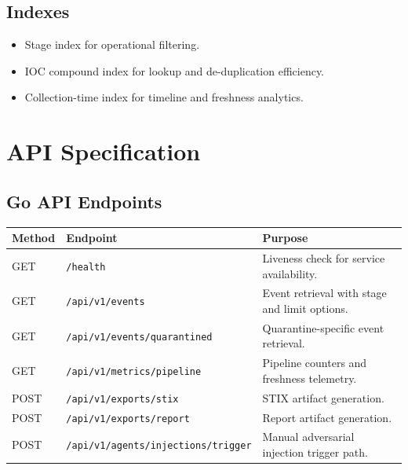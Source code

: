 \documentclass[11pt,a4paper]{article}
\begin{document}
\subsection{Indexes}
\begin{itemize}[leftmargin=1.5em]
  \item Stage index for operational filtering.
  \item IOC compound index for lookup and de-duplication efficiency.
  \item Collection-time index for timeline and freshness analytics.
\end{itemize}

\section{API Specification}
\subsection{Go API Endpoints}
\begin{longtable}{p{} p{} p{}}
\toprule
\textbf{Method} & \textbf{Endpoint} & \textbf{Purpose} \\
\midrule
GET & \texttt{/health} & Liveness check for service availability. \\
GET & \texttt{/api/v1/events} & Event retrieval with stage and limit options. \\
GET & \texttt{/api/v1/events/quarantined} & Quarantine-specific event retrieval. \\
GET & \texttt{/api/v1/metrics/pipeline} & Pipeline counters and freshness telemetry. \\
POST & \texttt{/api/v1/exports/stix} & STIX artifact generation. \\
POST & \texttt{/api/v1/exports/report} & Report artifact generation. \\
POST & \texttt{/api/v1/agents/injections/trigger} & Manual adversarial injection trigger path. \\
\bottomrule
\end{longtable}
\end{document}
